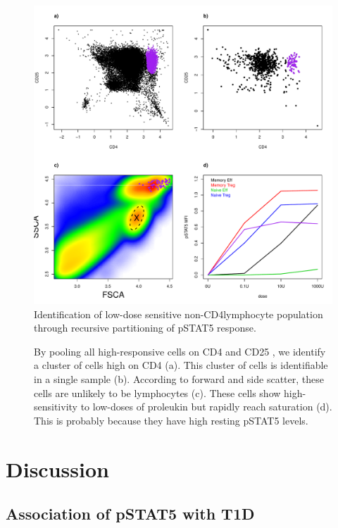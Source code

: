\hspace{-2cm}
\begin{figure}[h]
\centering
\includegraphics[scale=.5]{IL2/figures/new-cell-subset.pdf}
{ Identification of low-dose sensitive non-CD4\positive lymphocyte population through recursive partitioning of pSTAT5 response. }
{
  By pooling all high-responsive cells on CD4 and CD25 , we identify a cluster of cells high on CD4 (a).
  This cluster of cells is identifiable in a single sample (b).
  According to forward and side scatter, these cells are unlikely to be lymphocytes (c).
  These cells show high-sensitivity to low-doses of proleukin but rapidly reach saturation (d).
  This is probably because they have high resting pSTAT5 levels.
  
}
\end{figure}




\section{Discussion}

\subsection{Association of pSTAT5 with T1D}

